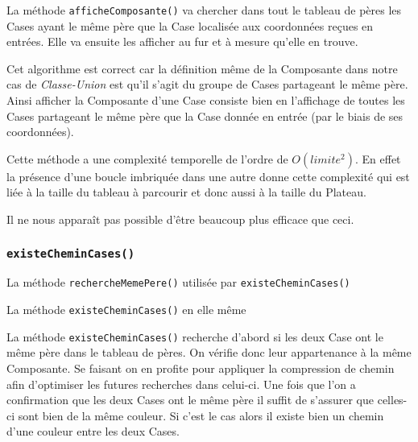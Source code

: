 \documentclass{article}
\newcommand{\info}{\texttt}
\begin{document}
                La méthode \info{afficheComposante()} va chercher dans tout le tableau de pères les Cases ayant le même père que la Case localisée aux coordonnées reçues en entrées. Elle va ensuite les afficher au fur et à mesure qu'elle en trouve.
                
                Cet algorithme est correct car la définition même de la Composante dans notre cas de \emph{Classe-Union} est qu'il s'agit du groupe de Cases partageant le même père. Ainsi afficher la Composante d'une Case consiste bien en l'affichage de toutes les Cases partageant le même père que la Case donnée en entrée (par le biais de ses coordonnées).
                
                Cette méthode a une complexité temporelle de l'ordre de $O(limite^{2})$. En effet la présence d'une boucle imbriquée dans une autre donne cette complexité qui est liée à la taille du tableau à parcourir et donc aussi à la taille du Plateau.
                
                Il ne nous apparaît pas possible d'être beaucoup plus efficace que ceci.
                
            \subsubsection{\info{existeCheminCases()}}
            
                \begin{algorithm}[H]
                \caption{La méthode \info{rechercheMemePere()} utilisée par \info{existeCheminCases()}}
                \end{algorithm}
                
                \begin{algorithm}[H]
                \caption{La méthode \info{existeCheminCases()} en elle même}
                \end{algorithm}
                
                La méthode \info{existeCheminCases()} recherche d'abord si les deux Case ont le même père dans le tableau de pères. On vérifie donc leur  appartenance à la même Composante. Se faisant on en profite pour appliquer la compression de chemin afin d'optimiser les futures recherches dans celui-ci. Une fois que l'on a confirmation que les deux Cases ont le même père il suffit de s'assurer que celles-ci sont bien de la même couleur. Si c'est le cas alors il existe bien un chemin d'une couleur entre les deux Cases.
                
\end{document}

